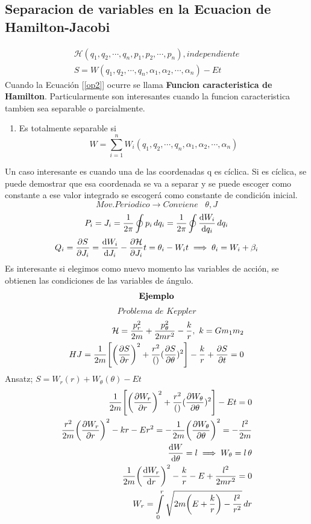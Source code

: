 \documentclass[12pt]{article}
\newcommand{\eq}[1]{\[#1\]}
\renewcommand{\H}{\mathcal{H}}
\newcommand{\en}[1]{\[\boxed{#1}\]}
\newcommand{\inv}[1]{\frac{1}{#1}}
\newcommand{\intt}[2]{\int\limits_{#1}^{#2}}
\newcommand{\sumn}[1]{\sum_{#1 =1}^{n}}
\renewcommand{\ss}[1]{\subsection{#1}}
\newcommand{\xn}[1]{{#1}_{1},{#1}_{2},\cdots,{#1}_{n}}
\newcommand{\ej}{\[\textrm{\textbf{Ejemplo}} \]}
\newcommand{\eqreff}[1]{Ecuación [\ref{#1}]}
\begin{document}
\ss{Separacion de variables en la Ecuacion de Hamilton-Jacobi}
\begin{align}
\H(\xn{q},\xn{p}), independiente\\
\boxed{S= W(\xn{q},\xn{\alpha})-Et}\label{op2}
\end{align}
Cuando la \eqreff{op2} ocurre se llama \textbf{Funcion caracteristica de Hamilton}. Particularmente son interesantes cuando la funcion caracteristica tambien sea separable o parcialmente. \\
\begin{enumerate}
\item Es totalmente separable si
\en{W=\sumn{i} W_i (\xn{q},\xn{\alpha})}
\end{enumerate}
Un caso interesante es cuando una de las coordenadas q es cíclica. Si es cíclica, se puede demostrar que esa coordenada se va a separar y se puede escoger como constante a ese valor integrado se escogerá como constante de condición inicial.
\eq{Mov.Periodico \rightarrow Conviene \,\,\,\,\, \theta,J}
\eq{P_i=J_i = \inv{2\pi}\oint p_i \,dq_i = \inv{2\pi} \oint \dv{W_i}{q_i}  \, dq_i}
\begin{align}
Q_i = \pdv{S}{J_i}=\dv{W_i}{J_i}- \pdv{\H}{J_i}t=\theta_i - W_i t\implies \theta_i = W_i + \beta_i
\end{align}
Es interesante si elegimos como nuevo momento las variables de acción, se obtienen las condiciones de las variables de ángulo. \\
\ej
\eq{\textit{Problema de Keppler}}
\begin{align}
\H= \frac{p_r^2}{2m}+ \frac{p_\theta^2}{2mr^2}-\frac{k}{r},\,\, k = Gm_1m_2\\
HJ= \inv{2m} \qty[\qty(\pdv{S}{r})^2 + \frac{r^2}\qty(\pdv{S}{\theta})^2] - \frac{k}{r}+\pdv{S}{t}	=0
\end{align}
Ansatz; $S= W_r(r)+ W_\theta (\theta) -Et$\\
\begin{align}
	\inv{2m} \qty[\qty(\pdv{W_r}{r})^2 + \frac{r^2}\qty(\pdv{W_\theta}{\theta})^2] -Et	=0\\
\frac{r^2}{2m} 	\qty(\pdv{W_r}{r})^2 - kr- Er^2=-\inv{2m}\qty(\pdv{W_\theta}{\theta})^2=-\frac{l^2}{2m}\\
\dv{W}{\theta}=l \implies W_\theta = l \, \theta\\
\inv{2m}\qty(\dv{W_r}{r})^2 - \frac{k}{r}-E+\frac{l^2}{2mr^2}=0\\
W_r = \intt{0}{r}\sqrt{2m\qty(E+\frac{k}{r})-\frac{l^2}{r^2}}\,dr
\end{align}
\end{document}

